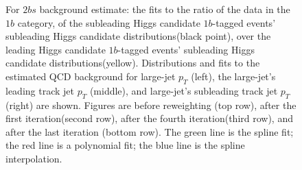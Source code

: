 \begin{figure}[htbp!]
\begin{center}
\caption{For $2bs$ background estimate: the fits to the ratio of the data in the $1b$ category, of the subleading Higgs candidate $1b$-tagged events' subleading Higgs candidate distributions(black point), over the leading Higgs candidate $1b$-tagged events' subleading Higgs candidate distributions(yellow). Distributions and fits to the estimated QCD background for large-\R jet $p_{T}$ (left), the large-\R jet's leading track jet $p_T$ (middle), and large-\R jet's subleading track jet $p_T$ (right) are shown.  Figures are before reweighting (top row), after the first iteration(second row), after the fourth iteration(third row), and after the last iteration (bottom row). The green line is the spline fit; the red line is a polynomial fit; the blue line is the spline interpolation.}
\label{fig:rw-2bs-lead}
\end{center}
\end{figure}

